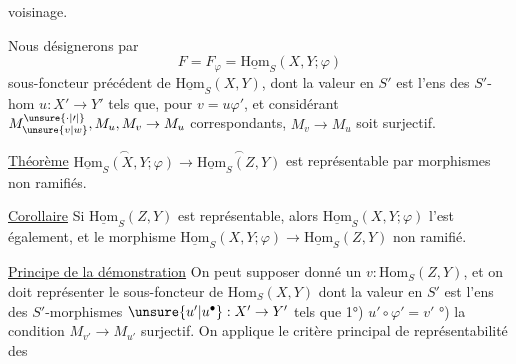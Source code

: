 
voisinage.

Nous désignerons par
\[
F=F_\varphi=\underline{\mathrm{Hom}}_S(X,Y;\varphi)
\]
 sous-foncteur précédent de $\underline{\mathrm{Hom}}_S(X,Y)$, dont la valeur en $S'$ est l'ens des $S'$-hom $u:X'\to Y'$ tels que, pour $v=u\varphi'$, et considérant $M_{\unsure{v|w}}^{\unsure{\cdot|\prime|{}}},M_u,M_v\to M_u$ correspondants, $M_v\to M_u$ soit surjectif.

\uline{Théorème} $\overset{\frown}{\underline{\mathrm{Hom}}_S(X,Y;\varphi)}\longrightarrow\overset{\frown}{\underline{\mathrm{Hom}}_S(Z,Y)}$ est représentable par morphismes non ramifiés.

\uline{Corollaire} Si $\underline{\mathrm{Hom}}_S(Z,Y)$ est représentable, alors $\underline{\mathrm{Hom}}_S(X,Y;\varphi)$ l'est également, et le morphisme $\underline{\mathrm{Hom}}_S(X,Y;\varphi)\longrightarrow\underline{\mathrm{Hom}}_S(Z,Y)$  non ramifié.

\uline{Principe de la démonstration} On peut supposer donné un $v:\mathrm{Hom}_S(Z,Y)$, et on doit représenter le sous-foncteur de $\mathrm{Hom}_S(X,Y)$ dont la valeur en $S'$ est l'ens des $S'$-morphismes $\unsure{u'|u^{\bullet}}:X'\to Y'$ tels que 1°) $u'\circ\varphi'=v'$ °) la condition $M_{v'}\to M_{u'}$ surjectif. On applique le critère principal de représentabilité  des 
